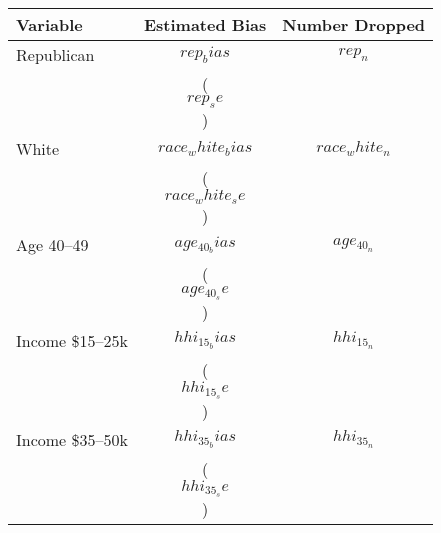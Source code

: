 \begin{tabular}{l c c}
  \hline
  \hline
  Variable & Estimated Bias & Number Dropped \\
  \hline
  Republican & $$rep_bias$$ & $$rep_n$$ \\
           &   ($$rep_se$$) & \\
  White & $$race_white_bias$$ & $$race_white_n$$ \\
           &   ($$race_white_se$$) & \\
  Age 40--49 & $$age_40_bias$$ & $$age_40_n$$ \\
           &   ($$age_40_se$$) & \\
  Income \$15--25k & $$hhi_15_bias$$ & $$hhi_15_n$$ \\
           &   ($$hhi_15_se$$) & \\
  Income \$35--50k & $$hhi_35_bias$$ & $$hhi_35_n$$ \\
           &   ($$hhi_35_se$$) & \\  
\hline   
\hline 
\end{tabular}

